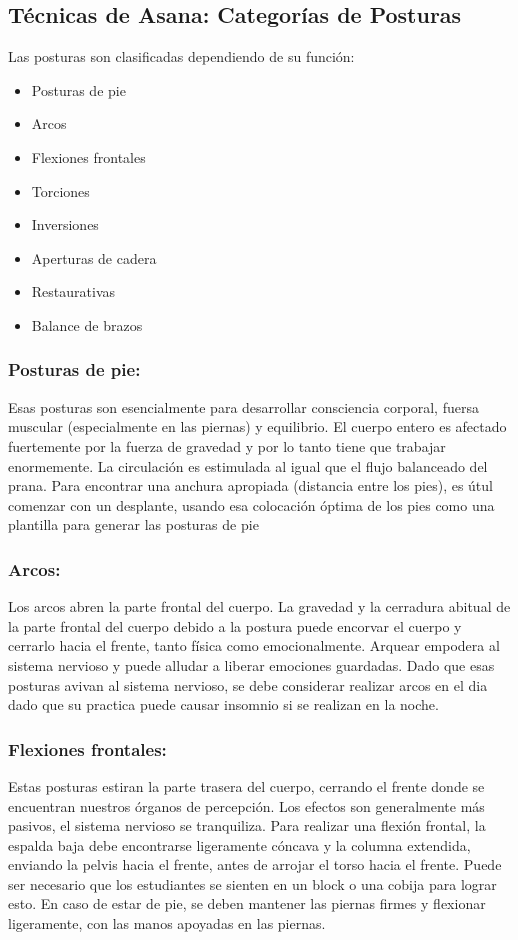 \subsection{Técnicas de Asana: Categorías de Posturas}
Las posturas son clasificadas dependiendo de su función:

\begin{itemize}
	\item Posturas de pie
	\item Arcos
	\item Flexiones frontales
	\item Torciones
	\item Inversiones
	\item Aperturas de cadera
	\item Restaurativas
	\item Balance de brazos
\end{itemize}

\subsubsection{Posturas de pie:}
Esas posturas son esencialmente para desarrollar consciencia corporal, fuersa muscular (especialmente en las piernas) y equilibrio. El cuerpo entero es afectado fuertemente por la fuerza de gravedad y por lo tanto tiene que trabajar enormemente. La circulación es estimulada al igual que el flujo balanceado del prana. Para encontrar una anchura apropiada (distancia entre los pies), es útul comenzar con un desplante, usando esa colocación óptima de los pies como una plantilla para generar las posturas de pie

\subsubsection{Arcos:}
Los arcos abren la parte frontal del cuerpo. La gravedad y la cerradura abitual de la parte frontal del cuerpo debido a la postura puede encorvar el cuerpo y cerrarlo hacia el frente, tanto física como emocionalmente. Arquear empodera al sistema nervioso y puede alludar a liberar emociones guardadas. Dado que esas posturas avivan al sistema nervioso, se debe considerar realizar arcos en el dia dado que su practica puede causar insomnio si se realizan en la noche.

\subsubsection{Flexiones frontales:}
Estas posturas estiran la parte trasera del cuerpo, cerrando el frente donde se encuentran nuestros órganos de percepción. Los efectos son generalmente más pasivos, el sistema nervioso se tranquiliza. Para realizar una flexión frontal, la espalda baja debe encontrarse ligeramente cóncava y la columna extendida, enviando la pelvis hacia el frente, antes de arrojar el torso hacia el frente. Puede ser necesario que los estudiantes se sienten en un block o una cobija para lograr esto. En caso de estar de pie, se deben mantener las piernas firmes y flexionar ligeramente, con las manos apoyadas en las piernas.

